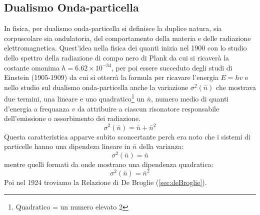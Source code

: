 \subsection{Dualismo Onda-particella}
\label{sec:dualismoOnda-part}
\begin{defi}
  In fisica, per dualismo onda-particella si definisce la duplice natura, sia corpuscolare sia ondulatoria, del
  comportamento della materia e delle radiazione elettromagnetica. Quest'idea nella fisica dei quanti inizia nel
  1900 con lo studio dello spettro della radiazione di compo nero di Plank da cui si ricaverà la costante omonima
  $h=6.62\times 10^{-34}$, per poi essere succeduto degli studi di Einstein (1905-1909) da cui si otterrà la formula
  per ricavare l'energia $E=hv$ e nello studio sul dualismo onda-particella anche la variazione $\sigma^2(\bar{n})$
  che mostrava due termini, una lineare e uno quadratico\footnote{Quadratico = un numero elevato 2} un $\bar{n}$,
  numero medio di quanti d'energia a frequanza $v$ da attribuire a ciascun risonatore responsabile dell'emissione
  o assorbimento dei radiazione.
  \begin{equation}
    \label{eq:numeromediodiquanti}
    \sigma^2(\bar{n})=\bar{n}+\bar{n}^2
  \end{equation}
  Questa caratteristica apparve subito sconcertante perch era noto che i sistemi di particelle hanno una dipendeza
  lineare in $\bar{n}$ della varianza:
  \begin{equation}
    \label{eq:rapportodipendenteadn}
    \sigma^2(\bar{n})=\bar{n}
  \end{equation}
  mentre quelli formati da onde mostrano una dipendenza quadratica:
  \begin{equation}
    \label{eq:ondedipendenzaquadratica}
    \sigma^2(\bar{n})=\bar{n}^2
  \end{equation}
  Poi nel 1924 troviamo la Relazione di De Broglie (\ref{sec:deBroglie}).
\end{defi}

